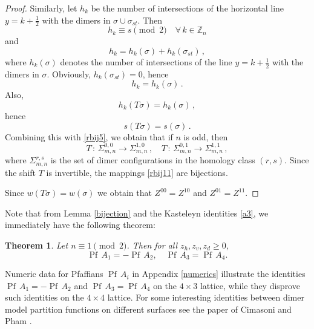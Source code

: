 \documentclass[12pt,reqno]{amsart}
\numberwithin{equation}{section}
\newcommand{\Z}{{\mathbb Z}}
\newcommand{\sg}{\sigma}
\newcommand{\Pf}{{\operatorname{Pf}\,}}
\newtheorem{theo}{{\sc \bf Theorem}}[section]
\begin{document}
\begin{proof}
Similarly, let $h_k$ be the number of intersections of the horizontal line $y=k+\frac{1}{2}$ with the dimers in $\sg\cup\sg_{st}$. Then 
\begin{equation}\label{rbij6}
h_k\equiv s\pmod 2 \quad \forall\,k\in\Z_n
\end{equation}
and
\begin{equation}\label{rbij7}
 h_k= h_k(\sg)+h_k(\sg_{st})\,,
\end{equation}
where $h_k(\sg)$ denotes the number of intersections of the line $y=k+\frac{1}{2}$ with the dimers in $\sg$. Obviously, $h_k(\sg_{st})=0$, hence
\begin{equation}\label{rbij8}
 h_k= h_k(\sg)\,.
\end{equation}
Also,
\begin{equation}\label{rbij9}
  h_k(T\sg)=h_k(\sg)\,,
\end{equation}
hence
\begin{equation}\label{rbij10}
  s(T\sg)=s(\sg)\,.
\end{equation}
Combining this with \eqref{rbij5}, we obtain that if $n$ is odd, then 
\begin{equation}\label{rbij11}
T\,:\, \Sigma_{m,n}^{0,0}\to \Sigma_{m,n}^{1,0}\,,\quad
T\,:\, \Sigma_{m,n}^{0,1}\to \Sigma_{m,n}^{1,1}\,,
\end{equation}
where $\Sigma_{m,n}^{r,s}$ is the set of dimer configurations in
the homology class $(r,s)$. Since the shift $T$ is invertible, the mappings
\eqref{rbij11} are bijections.

Since $w(T\sg)=w(\sg)$ we obtain that $Z^{00}=Z^{10}$ and $Z^{01}=Z^{11}$.
\end{proof}

Note that from Lemma \ref{bijection} and the Kasteleyn identities \eqref{a3}, we immediately have the following theorem:
\begin{theo}\label{Conj} Let $n\equiv 1\pmod 2$. Then 
for all $z_h,z_v,z_d\ge 0$,
\begin{equation}\label{con0}
\Pf A_1=-\Pf A_2,\quad \Pf A_3=\Pf A_4.
\end{equation}
\end{theo}

Numeric data for Pfaffians $\Pf A_i$ in Appendix \ref{numerics} illustrate the identities
$\Pf A_1=-\Pf A_2$ and $\Pf A_3=\Pf A_4$ on the $4\times 3$ lattice, while they disprove
such identities on the $4\times 4$ lattice. For some interesting identities between dimer model partition functions on different surfaces see the paper of Cimasoni and Pham \cite{CimPham}.
\end{document}
